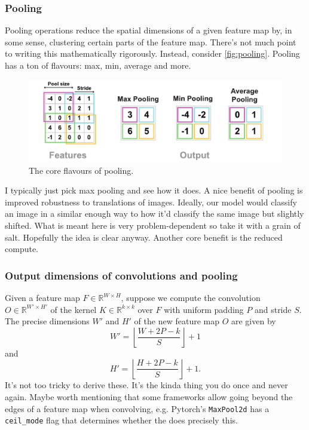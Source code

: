 \documentclass[11pt]{article}
\begin{document}
\subsubsection{Pooling}
Pooling operations reduce the spatial dimensions of a given feature map by, in some sense, clustering certain parts of the feature map. There's not much point to writing this mathematically rigorously. Instead, consider \autoref{fig:pooling}. Pooling has a ton of flavours: max, min, average and more.

\begin{figure}[ht]
    \centering
    \includegraphics[width=1\textwidth]{./figures/neural_nets/pooling.pdf}
    \caption{\centering The core flavours of pooling.}
    \label{fig:pooling}
\end{figure}

\noindent I typically just pick max pooling and see how it does. A nice benefit of pooling is improved robustness to translations of images. Ideally, our model would classify an image in a similar enough way to how it'd classify the same image but slightly shifted. What is meant here is very problem-dependent so take it with a grain of salt. Hopefully the idea is clear anyway. Another core benefit is the reduced compute.

\subsubsection*{Output dimensions of convolutions and pooling}
Given a feature map $F\in\mathbb{R}^{W\times H}$, suppose we compute the convolution $O\in\mathbb{R}^{W'\times H'}$ of the kernel $K\in\mathbb{R}^{k\times k}$ over $F$ with uniform padding $P$ and stride $S$. The precise dimensions $W'$ and $H'$ of the new feature map $O$ are given by
$$
W'
=
\left\lfloor
\frac{W+2P-k}{S}
\right\rfloor
+1
$$
and
$$
H'
=
\left\lfloor
\frac{H+2P-k}{S}
\right\rfloor
+1.
$$
It's not too tricky to derive these. It's the kinda thing you do once and never again. Maybe worth mentioning that some frameworks allow going beyond the edges of a feature map when convolving, e.g. Pytorch's \texttt{MaxPool2d} has a \texttt{ceil\_mode} flag that determines whether the does precisely this.
\end{document}
